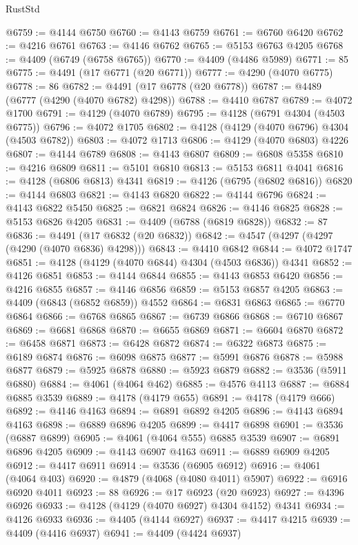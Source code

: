 \begin{lexlean}{RustStd}
\begin{coremodule}
@6759 := @4144 @6750
@6760 := @4143 @6759
@6761 := @6760 @6420
@6762 := @4216 @6761
@6763 := @4146 @6762
@6765 := @5153 @6763 @4205
@6768 := @4409 (@6749 (@6758 @6765))
@6770 := @4409 (@4486 @5989)
@6771 := 85
@6775 := @4491 (@17 @6771 (@20 @6771))
@6777 := @4290 (@4070 @6775)
@6778 := 86
@6782 := @4491 (@17 @6778 (@20 @6778))
@6787 := @4489 (@6777 (@4290 (@4070 @6782) @4298))
@6788 := @4410 @6787
@6789 := @4072 @1700
@6791 := @4129 (@4070 @6789)
@6795 := @4128 (@6791 @4304 (@4503 @6775))
@6796 := @4072 @1705
@6802 := @4128 (@4129 (@4070 @6796) @4304 (@4503 @6782))
@6803 := @4072 @1713
@6806 := @4129 (@4070 @6803) @4226
@6807 := @4144 @6789
@6808 := @4143 @6807
@6809 := @6808 @5358
@6810 := @4216 @6809
@6811 := @5101 @6810
@6813 := @5153 @6811 @4041
@6816 := @4128 (@6806 @6813) @4341
@6819 := @4126 (@6795 (@6802 @6816))
@6820 := @4144 @6803
@6821 := @4143 @6820
@6822 := @4144 @6796
@6824 := @4143 @6822 @5450
@6825 := @6821 @6824
@6826 := @4146 @6825
@6828 := @5153 @6826 @4205
@6831 := @4409 (@6788 (@6819 @6828))
@6832 := 87
@6836 := @4491 (@17 @6832 (@20 @6832))
@6842 := @4547 (@4297 (@4297 (@4290 (@4070 @6836) @4298)))
@6843 := @4410 @6842
@6844 := @4072 @1747
@6851 := @4128 (@4129 (@4070 @6844) @4304 (@4503 @6836)) @4341
@6852 := @4126 @6851
@6853 := @4144 @6844
@6855 := @4143 @6853 @6420
@6856 := @4216 @6855
@6857 := @4146 @6856
@6859 := @5153 @6857 @4205
@6863 := @4409 (@6843 (@6852 @6859)) @4552
@6864 := @6831 @6863
@6865 := @6770 @6864
@6866 := @6768 @6865
@6867 := @6739 @6866
@6868 := @6710 @6867
@6869 := @6681 @6868
@6870 := @6655 @6869
@6871 := @6604 @6870
@6872 := @6458 @6871
@6873 := @6428 @6872
@6874 := @6322 @6873
@6875 := @6189 @6874
@6876 := @6098 @6875
@6877 := @5991 @6876
@6878 := @5988 @6877
@6879 := @5925 @6878
@6880 := @5923 @6879
@6882 := @3536 (@5911 @6880)
@6884 := @4061 (@4064 @462)
@6885 := @4576 @4113
@6887 := @6884 @6885 @3539
@6889 := @4178 (@4179 @655)
@6891 := @4178 (@4179 @666)
@6892 := @4146 @4163
@6894 := @6891 @6892 @4205
@6896 := @4143 @6894 @4163
@6898 := @6889 @6896 @4205
@6899 := @4417 @6898
@6901 := @3536 (@6887 @6899)
@6905 := @4061 (@4064 @555) @6885 @3539
@6907 := @6891 @6896 @4205
@6909 := @4143 @6907 @4163
@6911 := @6889 @6909 @4205
@6912 := @4417 @6911
@6914 := @3536 (@6905 @6912)
@6916 := @4061 (@4064 @403)
@6920 := @4879 (@4068 (@4080 @4011) @5907)
@6922 := @6916 @6920 @4011
@6923 := 88
@6926 := @17 @6923 (@20 @6923)
@6927 := @4396 @6926
@6933 := @4128 (@4129 (@4070 @6927) @4304 @4152) @4341
@6934 := @4126 @6933
@6936 := @4405 (@4144 @6927)
@6937 := @4417 @4215
@6939 := @4409 (@4416 @6937)
@6941 := @4409 (@4424 @6937)

\end{coremodule}
\end{lexlean}
